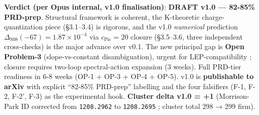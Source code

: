 \documentclass[
  11pt,
  a4paper,
]{article}
\begin{document}
\textbf{Verdict (per Opus internal, v1.0 finalisation)}: \textbf{DRAFT v1.0 --- 82-85\% PRD-prep}. Structural framework is coherent, the K-theoretic charge-quantization piece (§3.1--3.4) is rigorous, and the v1.0 \emph{numerical} prediction \(\Delta_{\mathrm{S08}}(-67) = 1.87 \times 10^{-4}\) via \(c_{\mathrm{Pic}} = 20\) closure (§3.5--3.6, three independent cross-checks) is the major advance over v0.1. The new principal gap is \textbf{Open Problem-3} (slope-vs-constant disambiguation), urgent for LEP-compatibility ; closure requires two-loop spectral-action expansion (3 weeks). Full PRD-tier readiness in 6-8 weeks (OP-1 + OP-3 + OP-4 + OP-5). v1.0 is \textbf{publishable to arXiv} with explicit ``82-85\% PRD-prep'' labelling and the four falsifiers (F-1, F-2, F-2', F-3) as the experimental hook. \textbf{Cluster delta v1.0 = +1} (Morrison-Park ID corrected from \texttt{1208.2962} to \texttt{1208.2695} ; cluster total 298 → 299 firm).
\end{document}
